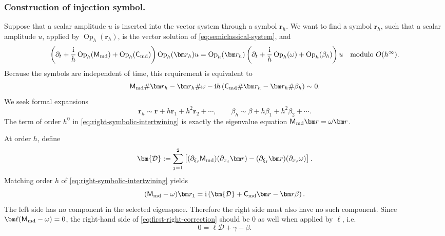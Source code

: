 \documentclass[11pt,reqno]{amsart}
\newcommand{\ii}{\mathrm{i}}
\newcommand{\Op}{\operatorname{Op}}
\numberwithin{equation}{section}
\begin{document}
\subsubsection{Construction of injection symbol.}\label{sec:injection-symbol}
Suppose that a scalar amplitude $u$ is inserted into the vector system through a symbol $\bm r_h$. We want to find a symbol $\bm r_h$, such that a scalar amplitude $u$, applied by $\Op_h(\bm{r}_h)$, is the vector solution of \eqref{eq:semiclassical-system}, and 
\begin{equation}\label{eq:intertwine}
\left(\partial_t+\frac{\ii}{h}\Op_h(\mathsf M_{\rm md})+\Op_h(\mathsf C_{\rm md})\right)\Op_h(\bm r_h)u=\Op_h(\bm r_h)\left(\partial_t+\frac{\ii}{h}\Op_h(\omega)+\Op_h(\beta_h)\right)u \quad\text{modulo }O(h^\infty).
\end{equation}
Because the symbols are independent of time, this requirement is equivalent to
\begin{equation}\label{eq:right-symbolic-intertwining}
    \mathsf M_{\rm md}\#\bm r_h-\bm r_h\#\omega-\ii h\left(\mathsf C_{\rm md}\#\bm r_h-\bm r_h\#\beta_h\right)\sim0.
\end{equation}
We seek formal expansions
\begin{equation*}
    \bm r_h\sim\bm r+h\bm r_1+h^2\bm r_2+\cdots,
    \qquad
    \beta_h\sim\beta+h\beta_1+h^2\beta_2+\cdots.
\end{equation*}
The term of order $h^0$ in \eqref{eq:right-symbolic-intertwining} is exactly the eigenvalue equation $\mathsf M_{\rm md}\bm r=\omega\bm r$.

At order $h$, define
\begin{equation*}
    \bm{\mathcal D}:=\sum_{j=1}^2\left[(\partial_{\xi_j}\mathsf M_{\rm md})(\partial_{x_j}\bm r)-(\partial_{\xi_j}\bm r)(\partial_{x_j}\omega)\right].
\end{equation*}
Matching order $h$ of \eqref{eq:right-symbolic-intertwining} yields
\begin{equation}\label{eq:first-right-correction}
    (\mathsf M_{\rm md}-\omega)\bm r_1 = \ii\left(\bm{\mathcal D}+\mathsf C_{\rm md}\bm r-\bm r\beta\right).
\end{equation}
The left side has no component in the selected eigenspace. Therefore the right side must also have no such component. Since $\bm\ell(\mathsf M_{\rm md}-\omega)=0$, the right-hand side of \eqref{eq:first-right-correction} should be 0 as well when applied by $\bm\ell$, i.e.
$$
    0 = \bm{\ell}\bm{\mathcal D}+\gamma-\beta.
$$
\end{document}

